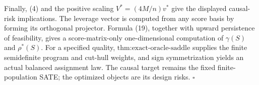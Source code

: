 Finally, (4) and the positive scaling \(V^*=(4M/n)v^*\) give the displayed causal-risk implications.  The leverage vector is computed from any score basis by forming its orthogonal projector.  Formula (19), together with upward persistence of feasibility, gives a score-matrix-only one-dimensional computation of \(\gamma(S)\) and \(\rho^*(S)\).  For a specified quality, \(\text{thm:exact-oracle-saddle}\) supplies the finite semidefinite program and cut-hull weights, and sign symmetrization yields an actual balanced assignment law.  The causal target remains the fixed finite-population SATE; the optimized objects are its design risks. \(\square\)